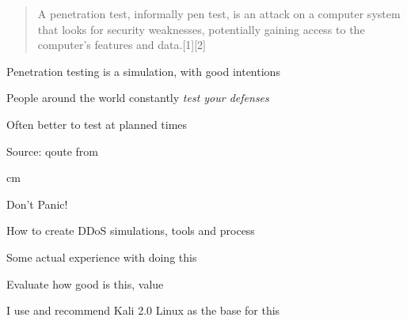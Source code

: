 \documentclass[20pt,landscape,a4paper,footrule]{foils}
\begin{document}


\hlkprofiluk


\begin{quote}
A penetration test, informally pen test, is an attack on a computer system that looks for security weaknesses, potentially gaining access to the computer's features and data.[1][2]
\end{quote}

\begin{list1}
\item Penetration testing is a simulation, with good intentions
\item People around the world constantly \emph{test your defenses}
\item Often better to test at planned times
\end{list1}

Source: qoute from 



 cm

\centerline{\color{titlecolor}\LARGE Don't Panic!}

\begin{list1}
\item How to create DDoS simulations, tools and process
\item Some actual experience with doing this
\item Evaluate how good is this, value
\end{list1}

\vskip 1cm
\centerline{I use and recommend Kali 2.0 Linux as the base for this}





\end{document}
